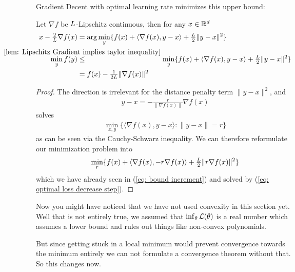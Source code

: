 Gradient Decent with optimal learning rate minimizes this upper bound:
%
\begin{lemma}
	Let \(\nabla f\) be \(L\)-Lipschitz continuous, then for any \(x\in\mathbb{R}^d\)
	\begin{subequations}
	\begin{align}
		x - \tfrac{2}{\ubound}\nabla f(x) 
		&= \arg\min_{y}\{
			f(x)+ \langle\nabla f(x), y-x\rangle + \tfrac{\ubound}{2}\|y-x\|^2 
		\}\\
		\label{eq: min approximation}
		\min_{y} f(y)	
		&\lxle{\ref{lem: Lipschitz Gradient implies taylor inequality}} \min_{y} \{
			f(x)+ \langle\nabla f(x), y-x\rangle + \tfrac{\ubound}{2}\|y-x\|^2 
		\} \\ \nonumber
		&= f(x) - \tfrac{1}{2\ubound} \|\nabla f(x)\|^2
	\end{align}
	\end{subequations}
\end{lemma}
\begin{proof}
	The direction is irrelevant for the distance penalty term \(\|y-x\|^2\), and
	\begin{align*}
		y-x = -\tfrac{r}{\|\nabla f(x)\|}\nabla f(x)
	\end{align*}	
	solves
	\begin{align*}
		\min_{x,y} \{\langle \nabla f(x), y-x \rangle : \|y-x\|=r \}
	\end{align*}
	as can be seen via the Cauchy-Schwarz inequality. We can  therefore
	reformulate our minimization problem into
	\begin{align*}
		\min_{r} \{ f(x) + \langle \nabla f(x), -r \nabla f(x)\rangle
		+ \tfrac{L}{2}\|r\nabla f(x)\|^2\}
	\end{align*}
	which we have already seen in (\ref{eq: bound increment}) and solved
	by (\ref{eq: optimal loss decrease step}).
\end{proof}

Now you might have noticed that we have not used convexity in this section yet.
Well that is not entirely true, we assumed that \(\inf_\theta\mathcal{L}(\theta)\)
is a real number which assumes a lower bound and rules out things like
non-convex polynomials.

But since getting stuck in a local minimum would prevent convergence towards the
minimum entirely we can not formulate a convergence theorem without that. So
this changes now.

